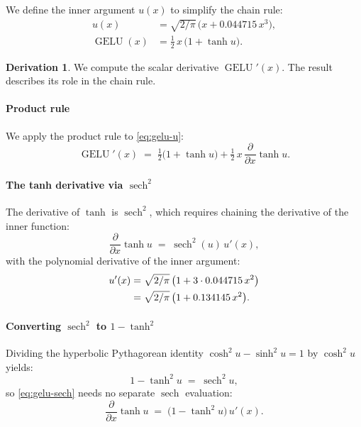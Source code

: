 \documentclass[letterpaper, 10 pt, conference]{ieeeconf}
\newcommand{\pdv}[2]{\frac{\partial #1}{\partial #2}}
\DeclareMathOperator{\gelu}{GELU}
\theoremstyle{definition}
\newtheorem*{derivation}{Derivation}
\begin{document}
We define the inner argument $u(x)$ to simplify the chain rule:
\begin{equation}
  \begin{aligned}
    u(x)     & = \sqrt{2/\pi}\,\bigl(x + 0.044715\,x^{3}\bigr), \\
    \gelu(x) & = \tfrac{1}{2}\,x\,\bigl(1 + \tanh u\bigr).
  \end{aligned}
  \label{eq:gelu-u}
\end{equation}

\begin{derivation}
  We compute the scalar derivative $\gelu'(x)$. The result describes its role in the chain rule.

  \paragraph{Product rule}
  We apply the product rule to \eqref{eq:gelu-u}:
  \begin{equation}
    \gelu'(x)
    \;=\;
    \tfrac{1}{2}\bigl(1 + \tanh u\bigr)
    + \tfrac{1}{2}\,x\,\pdv{}{x}\tanh u.
    \label{eq:gelu-product}
  \end{equation}

  \paragraph{The tanh derivative via $\operatorname{sech}^2$}
  The derivative of $\tanh$ is $\operatorname{sech}^{2}$, which requires chaining the derivative of the inner function:
  \begin{equation}
    \pdv{}{x}\tanh u
    \;=\;
    \operatorname{sech}^{2}(u)\,u'(x),
    \label{eq:gelu-sech}
  \end{equation}
  with the polynomial derivative of the inner argument:
  \begin{align}
    u'(x)
     & = \sqrt{2/\pi}\,\bigl(1 + 3 \cdot 0.044715\,x^{2}\bigr) \notag \\
     & = \sqrt{2/\pi}\,\bigl(1 + 0.134145\,x^{2}\bigr).
    \label{eq:gelu-du}
  \end{align}

  \paragraph{Converting $\operatorname{sech}^2$ to $1 - \tanh^2$}
  Dividing the hyperbolic Pythagorean identity $\cosh^{2} u - \sinh^{2} u = 1$ by $\cosh^{2} u$ yields:
  \begin{equation}
    1 - \tanh^{2} u \;=\; \operatorname{sech}^{2} u,
    \label{eq:sech-tanh}
  \end{equation}
  so \eqref{eq:gelu-sech} needs no separate $\operatorname{sech}$ evaluation:
  \begin{equation}
    \pdv{}{x}\tanh u
    \;=\;
    \bigl(1 - \tanh^{2} u\bigr)\,u'(x).
    \label{eq:gelu-tanhprime}
  \end{equation}


\end{derivation}
\end{document}

